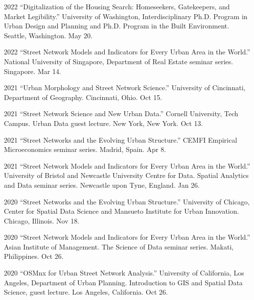 \documentclass[12pt,letterpaper]{report}
\begin{document}
    \begin{tablist}

        \item[2022] \tab{}\enquote{Digitalization of the Housing Search: Homeseekers, Gatekeepers, and Market Legibility.} University of Washington, Interdisciplinary Ph.D. Program in Urban Design and Planning and Ph.D. Program in the Built Environment. Seattle, Washington. May 20.

        \item[2022] \tab{}\enquote{Street Network Models and Indicators for Every Urban Area in the World.} National University of Singapore, Department of Real Estate seminar series. Singapore. Mar 14.

        \item[2021] \tab{}\enquote{Urban Morphology and Street Network Science.} University of Cincinnati, Department of Geography. Cincinnati, Ohio. Oct 15.

        \item[2021] \tab{}\enquote{Street Network Science and New Urban Data.} Cornell University, Tech Campus. Urban Data guest lecture. New York, New York. Oct 13.

        \item[2021] \tab{}\enquote{Street Networks and the Evolving Urban Structure.} CEMFI Empirical Microeconomics seminar series. Madrid, Spain. Apr 8.

        \item[2021] \tab{}\enquote{Street Network Models and Indicators for Every Urban Area in the World.} University of Bristol and Newcastle University Centre for Data. Spatial Analytics and Data seminar series. Newcastle upon Tyne, England. Jan 26.

        \item[2020] \tab{}\enquote{Street Networks and the Evolving Urban Structure.} University of Chicago, Center for Spatial Data Science and Mansueto Institute for Urban Innovation. Chicago, Illinois. Nov 18.

        \item[2020] \tab{}\enquote{Street Network Models and Indicators for Every Urban Area in the World.} Asian Institute of Management. The Science of Data seminar series. Makati, Philippines. Oct 26.

        \item[2020] \tab{}\enquote{OSMnx for Urban Street Network Analysis.} University of California, Los Angeles, Department of Urban Planning. Introduction to GIS and Spatial Data Science, guest lecture. Los Angeles, California. Oct 26.


\end{tablist}
\end{document}
